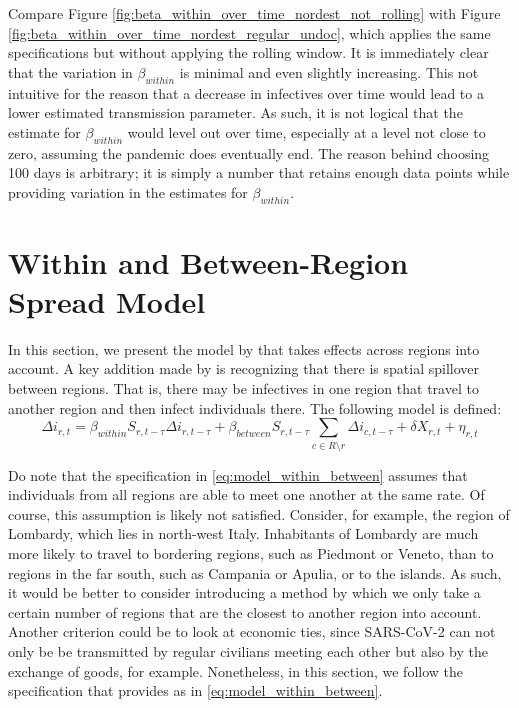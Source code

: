 \documentclass[12pt]{article}
\begin{document}
	Compare Figure \ref{fig:beta_within_over_time_nordest_not_rolling} with Figure \ref{fig:beta_within_over_time_nordest_regular_undoc}, which applies the same specifications but without applying the rolling window. It is immediately clear that the variation in $\beta_{within}$ is minimal and even slightly increasing. This not intuitive for the reason that a decrease in infectives over time would lead to a lower estimated transmission parameter. As such, it is not logical that the estimate for $\beta_{within}$ would level out over time, especially at a level not close to zero, assuming the pandemic does eventually end. The reason behind choosing 100 days is arbitrary; it is simply a number that retains enough data points while providing variation in the estimates for $\beta_{within}$.
	
	\section{Within and Between-Region Spread Model} \label{sec:model_within_between}
	In this section, we present the model by \textcite{adda2016economic} that takes effects across regions into account. A key addition made by \textcite{adda2016economic} is recognizing that there is spatial spillover between regions. That is, there may be infectives in one region that travel to another region and then infect individuals there. The following model is defined:
	\begin{equation} \label{eq:model_within_between}
	    \Delta i_{r,t} = \beta_{within}S_{r,t-\tau}\Delta i_{r,t-\tau} + \beta_{between}S_{r,t-\tau} \sum_{c \in R \setminus r} \Delta i_{c, t-\tau} + \delta X_{r,t} + \eta_{r,t}
	\end{equation}
	
	Do note that the specification in \eqref{eq:model_within_between} assumes that individuals from all regions are able to meet one another at the same rate. Of course, this assumption is likely not satisfied. Consider, for example, the region of Lombardy, which lies in north-west Italy. Inhabitants of Lombardy are much more likely to travel to bordering regions, such as Piedmont or Veneto, than to regions in the far south, such as Campania or Apulia, or to the islands. As such, it would be better to consider introducing a method by which we only take a certain number of regions that are the closest to another region into account. Another criterion could be to look at economic ties, since SARS-CoV-2 can not only be be transmitted by regular civilians meeting each other but also by the exchange of goods, for example. Nonetheless, in this section, we follow the specification that \textcite{adda2016economic} provides as in \eqref{eq:model_within_between}. \\
	
\end{document}
